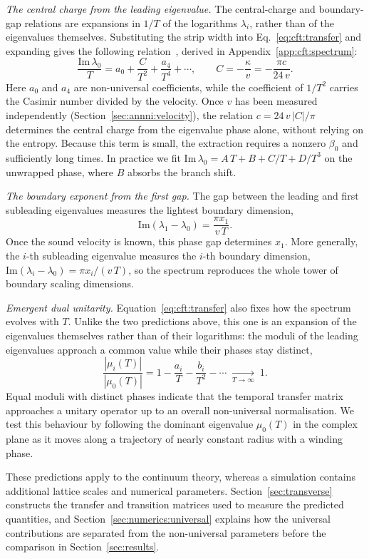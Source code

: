 \textit{The central charge from the leading eigenvalue.} The central-charge and boundary-gap relations are expansions in $1/T$ of the logarithms $\lambda_i$, rather than of the eigenvalues themselves. Substituting the strip width into Eq.~\eqref{eq:cft:transfer} and expanding gives the following relation~\cite{carignano_tagliacozzo2025}, derived in Appendix~\ref{app:cft:spectrum}:
\begin{equation}
  \frac{\mathrm{Im}\,\lambda_0}{T} = a_0 + \frac{C}{T^2} + \frac{a_4}{T^4} + \cdots,
  \qquad C = -\frac{\kappa}{v} = -\frac{\pi c}{24\,v}.
  \label{eq:cft:eq3}
\end{equation}
Here $a_0$ and $a_4$ are non-universal coefficients, while the coefficient of $1/T^2$ carries the Casimir number divided by the velocity. Once $v$ has been measured independently (Section~\ref{sec:annni:velocity}), the relation $c = 24\,v\,|C|/\pi$ determines the central charge from the eigenvalue phase alone, without relying on the entropy. Because this term is small, the extraction requires a nonzero $\beta_0$ and sufficiently long times. In practice we fit $\mathrm{Im}\,\lambda_0 = A\,T + B + C/T + D/T^3$ on the unwrapped phase, where $B$ absorbs the branch shift.

\textit{The boundary exponent from the first gap.} The gap between the leading and first subleading eigenvalues measures the lightest boundary dimension,
\begin{equation}
  \mathrm{Im}(\lambda_1-\lambda_0) = \frac{\pi x_1}{v\,T}.
  \label{eq:cft:eq4}
\end{equation}
Once the sound velocity is known, this phase gap determines $x_1$. More generally, the $i$-th subleading eigenvalue measures the $i$-th boundary dimension, $\mathrm{Im}(\lambda_i-\lambda_0) = \pi x_i/(v\,T)$, so the spectrum reproduces the whole tower of boundary scaling dimensions.

\textit{Emergent dual unitarity.} Equation~\eqref{eq:cft:transfer} also fixes how the spectrum evolves with $T$. Unlike the two predictions above, this one is an expansion of the eigenvalues themselves rather than of their logarithms: the moduli of the leading eigenvalues approach a common value while their phases stay distinct,
\begin{equation}
  \frac{|\mu_i(T)|}{|\mu_0(T)|}
  = 1 - \frac{a_i}{T} - \frac{b_i}{T^2} - \cdots
  \;\xrightarrow[T\to\infty]{}\; 1 .
  \label{eq:gapclose}
\end{equation}
Equal moduli with distinct phases indicate that the temporal transfer matrix approaches a unitary operator up to an overall non-universal normalisation. We test this behaviour by following the dominant eigenvalue $\mu_0(T)$ in the complex plane as it moves along a trajectory of nearly constant radius with a winding phase.

These predictions apply to the continuum theory, whereas a simulation contains additional lattice scales and numerical parameters. Section~\ref{sec:transverse} constructs the transfer and transition matrices used to measure the predicted quantities, and Section~\ref{sec:numerics:universal} explains how the universal contributions are separated from the non-universal parameters before the comparison in Section~\ref{sec:results}.
